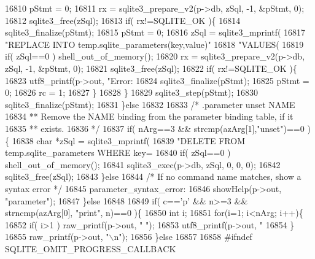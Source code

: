 \begin{DoxyCode}
{{{{{{{{{{{{{{{{{{{{{{{{{{{{{{{{{{{{{{{{{{{{{{{{{{{{{{{{{{{{{{{{{{{16810       pStmt = 0;
16811       rx = sqlite3_prepare_v2(p->db, zSql, -1, &pStmt, 0);
16812       sqlite3_free(zSql);
16813       \textcolor{keywordflow}{if}( rx!=SQLITE_OK )\{
16814         sqlite3_finalize(pStmt);
16815         pStmt = 0;
16816         zSql = sqlite3_mprintf(
16817                    \textcolor{stringliteral}{"REPLACE INTO temp.sqlite\_parameters(key,value)"}
16818                    \textcolor{stringliteral}{"VALUES(%
16819         \textcolor{keywordflow}{if}( zSql==0 ) shell_out_of_memory();
16820         rx = sqlite3_prepare_v2(p->db, zSql, -1, &pStmt, 0);
16821         sqlite3_free(zSql);
16822         \textcolor{keywordflow}{if}( rx!=SQLITE_OK )\{
16823           utf8_printf(p->out, \textcolor{stringliteral}{"Error: %
16824           sqlite3_finalize(pStmt);
16825           pStmt = 0;
16826           rc = 1;
16827         \}
16828       \}
16829       sqlite3_step(pStmt);
16830       sqlite3_finalize(pStmt);
16831     \}\textcolor{keywordflow}{else}
16832 
16833     \textcolor{comment}{/* .parameter unset NAME}
16834 \textcolor{comment}{    ** Remove the NAME binding from the parameter binding table, if it}
16835 \textcolor{comment}{    ** exists.}
16836 \textcolor{comment}{    */}
16837     \textcolor{keywordflow}{if}( nArg==3 && strcmp(azArg[1],\textcolor{stringliteral}{"unset"})==0 )\{
16838       \textcolor{keywordtype}{char} *zSql = sqlite3_mprintf(
16839           \textcolor{stringliteral}{"DELETE FROM temp.sqlite\_parameters WHERE key=%
16840       \textcolor{keywordflow}{if}( zSql==0 ) shell_out_of_memory();
16841       sqlite3_exec(p->db, zSql, 0, 0, 0);
16842       sqlite3_free(zSql);
16843     \}\textcolor{keywordflow}{else}
16844     \textcolor{comment}{/* If no command name matches, show a syntax error */}
16845     parameter\_syntax\_error:
16846     showHelp(p->out, \textcolor{stringliteral}{"parameter"});
16847   \}\textcolor{keywordflow}{else}
16848 
16849   \textcolor{keywordflow}{if}( c==\textcolor{charliteral}{'p'} && n>=3 && strncmp(azArg[0], \textcolor{stringliteral}{"print"}, n)==0 )\{
16850     \textcolor{keywordtype}{int} i;
16851     \textcolor{keywordflow}{for}(i=1; i<nArg; i++)\{
16852       \textcolor{keywordflow}{if}( i>1 ) raw_printf(p->out, \textcolor{stringliteral}{" "});
16853       utf8_printf(p->out, \textcolor{stringliteral}{"%
16854     \}
16855     raw_printf(p->out, \textcolor{stringliteral}{"\(\backslash\)n"});
16856   \}\textcolor{keywordflow}{else}
16857 
16858 \textcolor{preprocessor}{#ifndef SQLITE\_OMIT\_PROGRESS\_CALLBACK}
}}}}}}}}}}}}}}}}}}}}}}}}}}}}}}}}}}}}}}}}}}}}}}}}}}}}}}}}}}}}}}}}}}}}}}}
\end{DoxyCode}
